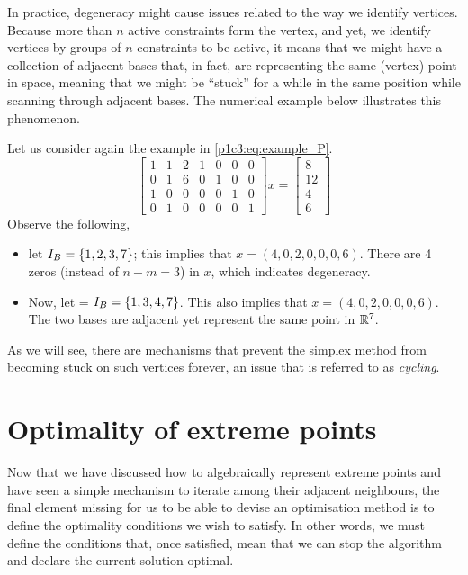 In practice, degeneracy might cause issues related to the way we identify vertices. Because more than $n$ active constraints form the vertex, and yet, we identify vertices by groups of $n$ constraints to be active, it means that we might have a collection of adjacent bases that, in fact, are representing the same (vertex) point in space, meaning that we might be ``stuck'' for a while in the same position while scanning through adjacent bases. The numerical example below illustrates this phenomenon. 

Let us consider again the example in \eqref{p1c3:eq:example_P}. 
%
\begin{equation*}
	\begin{bmatrix}
		1 & 1 & 2 & 1 & 0 & 0 & 0 \\
		0 & 1 & 6 & 0 & 1 & 0 & 0 \\
		1 & 0 & 0 & 0 & 0 & 1 & 0 \\
		0 & 1 & 0 & 0 & 0 & 0 & 1
	\end{bmatrix} 
	x =
	\begin{bmatrix}
		8  \\
		12 \\
		4  \\
		6   	
	\end{bmatrix}
\end{equation*}
%
Observe the following, 
%
\begin{itemize}
	\item let $I_B = \left\{ 1,2,3,7 \right \}$; this implies that $x = (4,0,2,0,0,0,6)$. There are 4 zeros (instead of $n-m=3$) in $x$, which indicates degeneracy. 
	\item Now, let = $I_B = \left\{ 1,3,4,7 \right \}$. This also implies that $x = (4,0,2,0,0,0,6)$. The two bases are adjacent yet represent the same point in $\mathbb{R}^7$.	
\end{itemize}
%
As we will see, there are mechanisms that prevent the simplex method from becoming stuck on such vertices forever, an issue that is referred to as \emph{cycling}. 



\section{Optimality of extreme points}

Now that we have discussed how to algebraically represent extreme points and have seen a simple mechanism to iterate among their adjacent neighbours, the final element missing for us to be able to devise an optimisation method is to define the optimality conditions we wish to satisfy. In other words, we must define the conditions that, once satisfied, mean that we can stop the algorithm and declare the current solution optimal.


